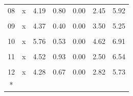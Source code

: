 \begin{longtable}[t]{ccrrrrr}
08 & x & 4.19 & 0.80 & 0.00 & 2.45 & 5.92\\
\cellcolor{gray!10}{09} & \cellcolor{gray!10}{(Intercept)} & \cellcolor{gray!10}{36417.17} & \cellcolor{gray!10}{22390.80} & \cellcolor{gray!10}{0.13} & \cellcolor{gray!10}{-12368.20} & \cellcolor{gray!10}{85202.53}\\
09 & x & 4.37 & 0.40 & 0.00 & 3.50 & 5.25\\
\cellcolor{gray!10}{10} & \cellcolor{gray!10}{(Intercept)} & \cellcolor{gray!10}{-2596.00} & \cellcolor{gray!10}{17639.27} & \cellcolor{gray!10}{0.89} & \cellcolor{gray!10}{-41028.68} & \cellcolor{gray!10}{35836.67}\\
10 & x & 5.76 & 0.53 & 0.00 & 4.62 & 6.91\\
\cellcolor{gray!10}{11} & \cellcolor{gray!10}{(Intercept)} & \cellcolor{gray!10}{5083.32} & \cellcolor{gray!10}{17705.01} & \cellcolor{gray!10}{0.78} & \cellcolor{gray!10}{-33492.58} & \cellcolor{gray!10}{43659.23}\\
11 & x & 4.52 & 0.93 & 0.00 & 2.50 & 6.54\\
\cellcolor{gray!10}{12} & \cellcolor{gray!10}{(Intercept)} & \cellcolor{gray!10}{5396.82} & \cellcolor{gray!10}{6831.22} & \cellcolor{gray!10}{0.44} & \cellcolor{gray!10}{-9487.13} & \cellcolor{gray!10}{20280.76}\\
12 & x & 4.28 & 0.67 & 0.00 & 2.82 & 5.73\\*
\end{longtable}
